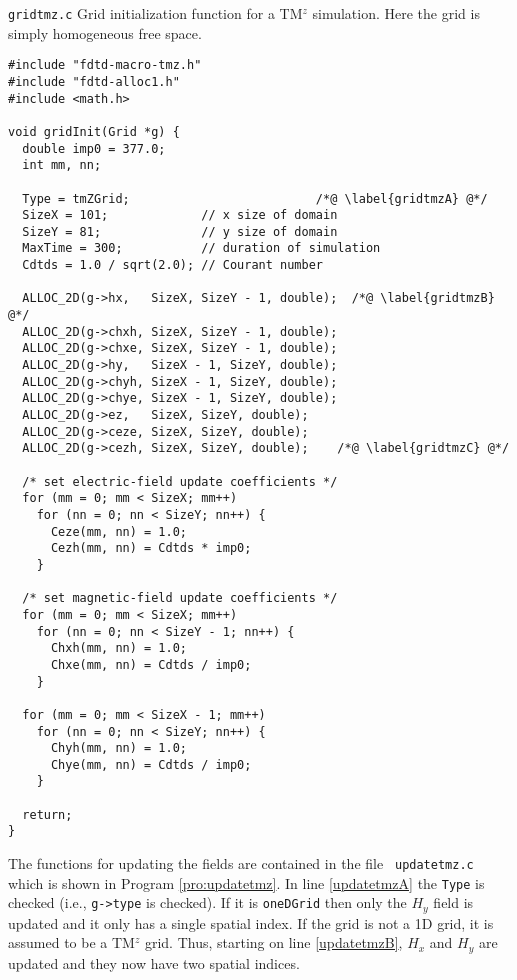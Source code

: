 \begin{program}
{\tt gridtmz.c} Grid initialization function for a TM$^z$ simulation.
Here the grid is simply homogeneous free space.
\label{pro:gridtmz}
\codemiddle
\begin{lstlisting}
#include "fdtd-macro-tmz.h"
#include "fdtd-alloc1.h"
#include <math.h>

void gridInit(Grid *g) {
  double imp0 = 377.0;
  int mm, nn;

  Type = tmZGrid;                          /*@ \label{gridtmzA} @*/
  SizeX = 101;             // x size of domain
  SizeY = 81;              // y size of domain
  MaxTime = 300;           // duration of simulation
  Cdtds = 1.0 / sqrt(2.0); // Courant number

  ALLOC_2D(g->hx,   SizeX, SizeY - 1, double);  /*@ \label{gridtmzB} @*/
  ALLOC_2D(g->chxh, SizeX, SizeY - 1, double);
  ALLOC_2D(g->chxe, SizeX, SizeY - 1, double);
  ALLOC_2D(g->hy,   SizeX - 1, SizeY, double);
  ALLOC_2D(g->chyh, SizeX - 1, SizeY, double);
  ALLOC_2D(g->chye, SizeX - 1, SizeY, double);
  ALLOC_2D(g->ez,   SizeX, SizeY, double);
  ALLOC_2D(g->ceze, SizeX, SizeY, double);
  ALLOC_2D(g->cezh, SizeX, SizeY, double);    /*@ \label{gridtmzC} @*/
 
  /* set electric-field update coefficients */
  for (mm = 0; mm < SizeX; mm++)
    for (nn = 0; nn < SizeY; nn++) {
      Ceze(mm, nn) = 1.0;
      Cezh(mm, nn) = Cdtds * imp0;
    }

  /* set magnetic-field update coefficients */
  for (mm = 0; mm < SizeX; mm++)
    for (nn = 0; nn < SizeY - 1; nn++) {
      Chxh(mm, nn) = 1.0;
      Chxe(mm, nn) = Cdtds / imp0;
    }

  for (mm = 0; mm < SizeX - 1; mm++)
    for (nn = 0; nn < SizeY; nn++) {
      Chyh(mm, nn) = 1.0;
      Chye(mm, nn) = Cdtds / imp0;
    }

  return;
}
\end{lstlisting}
\end{program}

The functions for updating the fields are contained in the file {\tt
  updatetmz.c} which is shown in Program \ref{pro:updatetmz}.  In line
\ref{updatetmzA} the {\tt Type} is checked (i.e., {\tt g->type} is
checked).  If it is {\tt oneDGrid} then only the $H_y$ field is
updated and it only has a single spatial index.  If the grid is not a
1D grid, it is assumed to be a TM$^z$ grid.  Thus, starting on line
\ref{updatetmzB}, $H_x$ and $H_y$ are updated and they now have two
spatial indices.

